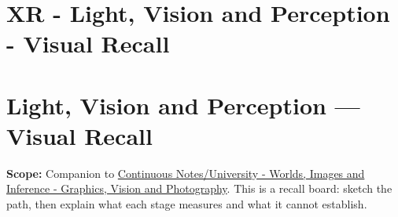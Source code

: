\hypertarget{appendix-73c6b8ed5a87}{}
\section*{XR - Light, Vision and Perception - Visual Recall}
\section{Light, Vision and Perception --- Visual Recall}\label{appendix-73c6b8ed5a87-light-vision-and-perception-visual-recall}

\textbf{Scope:} Companion to \href{Continuous\%20Notes/University\%20-\%20Worlds,\%20Images\%20and\%20Inference\%20-\%20Graphics,\%20Vision\%20and\%20Photography}{Continuous Notes/University - Worlds, Images and Inference - Graphics, Vision and Photography}. This is a recall board: sketch the path, then explain what each stage measures and what it cannot establish.


